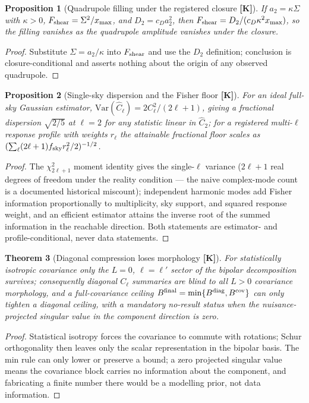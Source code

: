 \documentclass[10pt]{article}
\newtheorem{theorem}{Theorem}[section]
\newtheorem{proposition}[theorem]{Proposition}
\theoremstyle{definition}
\newcommand{\tier}[1]{\textbf{[#1]}}
\begin{document}
\begin{proposition}[Quadrupole filling under the registered closure
\tier{K}]
\label{prop:fill}
If $a_2 = \kappa\Sigma$ with $\kappa > 0$, $F_{\rm shear} =
\Sigma^2/x_{\max}$, and $D_2 = c_D a_2^2$, then
$F_{\rm shear} = D_2 / (c_D \kappa^2 x_{\max})$, so the filling
vanishes as the quadrupole amplitude vanishes under the closure.
\end{proposition}
\begin{proof}
Substitute $\Sigma = a_2/\kappa$ into $F_{\rm shear}$ and use the
$D_2$ definition; conclusion is closure-conditional and asserts
nothing about the origin of any observed quadrupole.
\end{proof}

\begin{proposition}[Single-sky dispersion and the Fisher floor
\tier{K}]
\label{prop:floor}
For an ideal full-sky Gaussian estimator,
$\mathrm{Var}(\widehat C_\ell) = 2C_\ell^2/(2\ell+1)$, giving a
fractional dispersion $\sqrt{2/5}$ at $\ell = 2$ for any statistic
linear in $\widehat C_2$; for a registered multi-$\ell$ response
profile with weights $r_\ell$ the attainable fractional floor scales
as $(\sum_\ell (2\ell+1) f_{\rm sky} r_\ell^2 / 2)^{-1/2}$.
\end{proposition}
\begin{proof}
The $\chi^2_{2\ell+1}$ moment identity gives the single-$\ell$
variance ($2\ell+1$ real degrees of freedom under the reality
condition --- the naive complex-mode count is a documented historical
miscount); independent harmonic modes add Fisher information
proportionally to multiplicity, sky support, and squared response
weight, and an efficient estimator attains the inverse root of the
summed information in the reachable direction. Both statements are
estimator- and profile-conditional, never data statements.
\end{proof}

\begin{theorem}[Diagonal compression loses morphology \tier{K}]
\label{thm:compress}
For statistically isotropic covariance only the $L = 0$,
$\ell = \ell'$ sector of the bipolar decomposition
\cite{HajianSouradeep2003} survives;
consequently diagonal $C_\ell$ summaries are blind to all $L > 0$
covariance morphology, and a full-covariance ceiling
$B^{\rm final} = \min\{B^{\rm diag}, B^{\rm cov}\}$ can only tighten
a diagonal ceiling, with a mandatory no-result status when the
nuisance-projected singular value in the component direction is zero.
\end{theorem}
\begin{proof}
Statistical isotropy forces the covariance to commute with rotations;
Schur orthogonality then leaves only the scalar representation in the
bipolar basis. The min rule can only lower or preserve a bound; a
zero projected singular value means the covariance block carries no
information about the component, and fabricating a finite number
there would be a modelling prior, not data information.
\end{proof}
\end{document}
